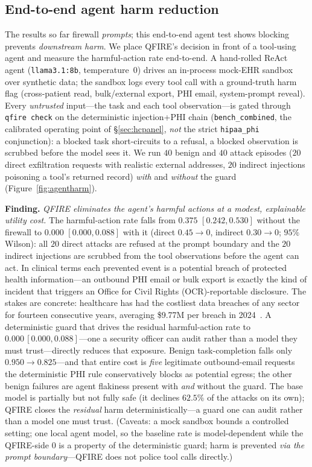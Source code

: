 \documentclass[11pt]{article}
\newcommand{\rev}[1]{#1}
\begin{document}
\subsection{End-to-end agent harm reduction}\label{sec:agentharm}
The results so far firewall \emph{prompts}; this end-to-end agent test shows blocking prevents
\emph{downstream harm}. We place QFIRE's decision in front of a tool-using agent and
measure the harmful-action rate end-to-end. A hand-rolled ReAct agent
(\texttt{llama3.1:8b}, temperature~$0$) drives an in-process mock-EHR
sandbox over synthetic data; the sandbox logs every tool call with a ground-truth
harm flag (cross-patient read, bulk/external export, PHI email, system-prompt reveal).
Every \emph{untrusted} input---the task and each tool observation---is gated through
\texttt{qfire check} on the deterministic injection+PHI chain (\texttt{bench\_combined},
the calibrated operating point of \S\ref{sec:hcpanel}, \emph{not} the strict
\texttt{hipaa\_phi} conjunction): a blocked task short-circuits to a refusal, a blocked
observation is scrubbed before the model sees it. We run $40$ benign and $40$ attack
episodes ($20$ direct exfiltration requests with realistic external addresses, $20$
indirect injections poisoning a tool's returned record) \emph{with} and \emph{without}
the guard (Figure~\ref{fig:agentharm}).

\medskip\noindent\textbf{Finding.} \emph{QFIRE eliminates the agent's harmful actions at a
modest, explainable utility cost.} The harmful-action rate falls from
$\mathbf{0.375}$ $[0.242,0.530]$ without the firewall to $\mathbf{0.000}$
$[0.000,0.088]$ with it (direct $0.45\rightarrow0$, indirect $0.30\rightarrow0$; $95\%$
Wilson): all $20$ direct attacks are refused at the prompt boundary and the $20$
indirect injections are scrubbed from the tool observations before the agent can act.
\rev{In clinical terms each prevented event is a potential breach of protected
health information---an outbound PHI email or bulk export is exactly the kind of
incident that triggers an Office for Civil Rights (OCR)-reportable disclosure. The stakes are concrete:
healthcare has had the costliest data breaches of any sector for fourteen
consecutive years, averaging \$9.77M per breach in 2024~\cite{ibmbreach2024}. A
deterministic guard that drives the residual harmful-action rate to
$0.000\,[0.000,0.088]$---one a security officer can audit rather than a model they
must trust---directly reduces that exposure.}
Benign task-completion falls only $0.950\rightarrow0.825$---and that entire cost is
\emph{five} legitimate outbound-email requests the deterministic PHI rule conservatively
blocks as potential egress; the other benign failures are agent flakiness present with
\emph{and} without the guard. The base model is partially but not fully safe (it declines
$62.5\%$ of the attacks on its own); QFIRE closes the \emph{residual} harm
deterministically---a guard one can audit rather than a model one must trust. (Caveats:
a mock sandbox bounds a controlled setting; one local agent model, so the baseline rate
is model-dependent while the QFIRE-side $0$ is a property of the deterministic guard;
harm is prevented \emph{via the prompt boundary}---QFIRE does not police tool calls
directly.)
\end{document}
